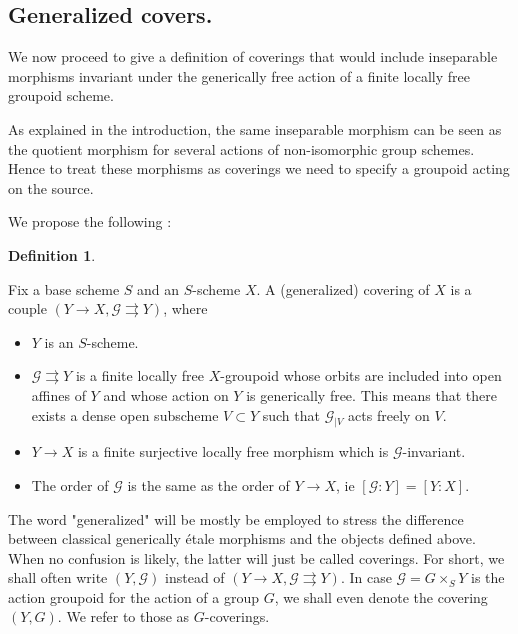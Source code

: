 \documentclass{amsart}
\theoremstyle{definition}
\newtheorem{defi}{Definition}[section]
\theoremstyle{remark}
\begin{document}
\subsection{Generalized covers.}

We now proceed to give a definition of coverings that would include inseparable morphisms invariant under the generically free action of a finite locally free groupoid scheme.

As explained in the introduction, the same inseparable morphism can be seen as the quotient morphism for several actions of non-isomorphic group schemes. Hence to treat these morphisms as coverings we need to specify a groupoid acting on the source.

We propose the following : 

\begin{defi}
\label{def}

Fix a base scheme $S$ and an $S$-scheme $X$. A (generalized) covering of $X$ is a couple $(Y {\longrightarrow} X, {{\mathcal G}} {\rightrightarrows} Y)$, where 

\begin{itemize}

\item $Y$ is an $S$-scheme.
\item ${{\mathcal G}} {\rightrightarrows} Y$ is a finite locally free $X$-groupoid whose orbits are included into open affines of $Y$ and whose action on $Y$ is generically free. This means that there exists a dense open subscheme $V \subset Y$ such that ${{\mathcal G}}_{\vert V}$ acts freely on $V$.

\item $Y {\longrightarrow} X$ is a finite surjective locally free morphism which is ${{\mathcal G}}$-invariant. 

\item The order of ${{\mathcal G}}$ is the same as the order of $Y {\longrightarrow} X$, ie $[{{\mathcal G}} : Y] = [Y:X]$.

\end{itemize}

The word "generalized" will be mostly be employed to stress the difference between classical generically \'etale morphisms and the objects defined above. When no confusion is likely, the latter will just be called coverings.
For short, we shall often write $(Y,{{\mathcal G}})$ instead of $(Y {\longrightarrow} X, {{\mathcal G}} {\rightrightarrows} Y)$. In case ${{\mathcal G}} = G \times_S Y$ is the action groupoid for the action of a group $G$, we shall even denote the covering $(Y,G)$. We refer to those as $G$-coverings. 
\end{defi}
\end{document}
